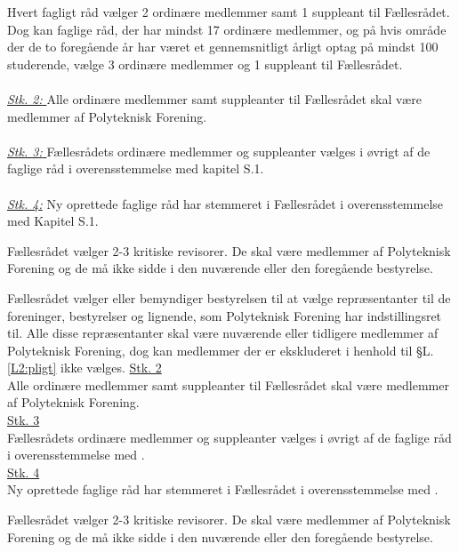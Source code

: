\begin{list}
\item \label{L:FR:ValgtilFR} Hvert fagligt råd vælger 2 ordinære medlemmer samt 1 suppleant til Fællesrådet. Dog kan faglige råd, der har mindst 17 ordinære medlemmer, og på hvis område der de to foregående år har været et gennemsnitligt årligt optag på mindst 100 studerende, vælge 3 ordinære medlemmer og 1 suppleant til Fællesrådet.\\
\\
\underline{\textit{Stk. 2: }} Alle ordinære medlemmer samt suppleanter til Fællesrådet skal være medlemmer af Polyteknisk Forening.\\
\\
\underline{\textit{Stk. 3: }} Fællesrådets ordinære medlemmer og suppleanter vælges i øvrigt af de faglige råd i overensstemmelse med kapitel S.1.
\\
\\
\underline{\textit{Stk. 4:}} Ny oprettede faglige råd har stemmeret i Fællesrådet i overensstemmelse med Kapitel S.1.

\item Fællesrådet vælger 2-3 kritiske revisorer. De skal være medlemmer af Polyteknisk Forening og de må ikke sidde i den nuværende eller den foregående bestyrelse. 

\item Fællesrådet vælger eller bemyndiger bestyrelsen til at vælge repræsentanter til de foreninger, bestyrelser og lignende, som Polyteknisk Forening har indstillingsret til. Alle disse repræsentanter skal være nuværende eller tidligere medlemmer af Polyteknisk Forening, dog kan medlemmer der er ekskluderet i henhold til §L.\ref{L2:pligt} ikke vælges.
\underline{Stk. 2}\\
Alle ordinære medlemmer samt suppleanter til Fællesrådet skal være medlemmer af Polyteknisk Forening.\\

\underline{Stk. 3}\\
Fællesrådets ordinære medlemmer og suppleanter vælges i øvrigt af de faglige råd i overensstemmelse med .\\

\underline{Stk. 4}\\
Ny oprettede faglige råd har stemmeret i Fællesrådet i overensstemmelse med .

\item Fællesrådet vælger 2-3 kritiske revisorer. De skal være medlemmer af Polyteknisk Forening og de må ikke sidde i den nuværende eller den foregående bestyrelse. 


\end{list}
